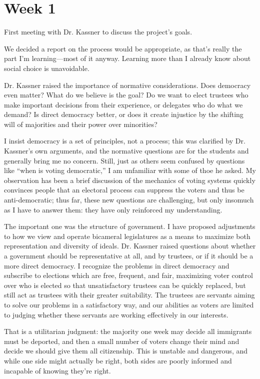 
\section{Week 1}

First meeting with Dr. Kassner to discuss the project's goals.

We decided a report on the process would be appropriate, as that's really the part I'm learning—most of it anyway.  Learning more than I already know about social choice is unavoidable.

Dr. Kassner raised the importance of normative considerations.  Does democracy even matter?  What do we believe is the goal?  Do we want to elect trustees who make important decisions from their experience, or delegates who do what we demand?  Is direct democracy better, or does it create injustice by the shifting will of majorities and their power over minorities?

I insist democracy is a set of principles, not a process; this was clarified by Dr. Kassner's own arguments, and the normative questions are for the students and generally bring me no concern.  Still, just as others seem confused by questions like ``when is voting democratic,'' I am unfamiliar with some of thoe he asked.  My observation has been a brief discussion of the mechanics of voting systems quickly convinces people that an electoral process can suppress the voters and thus be anti-democratic; thus far, these new questions are challenging, but only insomuch as I have to answer them:  they have only reinforced my understanding.

The important one was the structure of government.  I have proposed adjustments to how we view and operate bicameral legislatures as a means to maximize both representation and diversity of ideals.  Dr. Kassner raised questions about whether a government should be representative at all, and by trustees, or if it should be a more direct democracy.  I recognize the problems in direct democracy and subscribe to elections which are free, frequent, and fair, maximizing voter control over who is elected so that unsatisfactory trustees can be quickly replaced, but still act as trustees with their greater suitability.  The trustees are servants aiming to solve our problems in a satisfactory way, and our abilities as voters are limited to judging whether these servants are working effectively in our interests.

That is a utilitarian judgment:  the majority one week may decide all immigrants must be deported, and then a small number of voters change their mind and decide we should give them all citizenship.  This is unstable and dangerous, and while one side might actually be right, both sides are poorly informed and incapable of knowing they're right.

